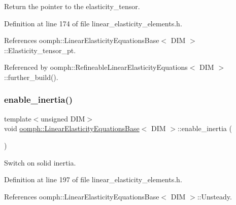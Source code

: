 Return the pointer to the elasticity\+\_\+tensor. 



Definition at line 174 of file linear\+\_\+elasticity\+\_\+elements.\+h.



References oomph\+::\+Linear\+Elasticity\+Equations\+Base$<$ D\+I\+M $>$\+::\+Elasticity\+\_\+tensor\+\_\+pt.



Referenced by oomph\+::\+Refineable\+Linear\+Elasticity\+Equations$<$ D\+I\+M $>$\+::further\+\_\+build().

\mbox{\label{classoomph_1_1LinearElasticityEquationsBase_ad69ad3d868ae9bbce38da212ca5ed4b7}} 
\subsubsection{\texorpdfstring{enable\+\_\+inertia()}{enable\_inertia()}}
{\footnotesize\ttfamily template$<$unsigned D\+IM$>$ \\
void \hyperlink{classoomph_1_1LinearElasticityEquationsBase}{oomph\+::\+Linear\+Elasticity\+Equations\+Base}$<$ D\+IM $>$\+::enable\+\_\+inertia (\begin{DoxyParamCaption}{ }\end{DoxyParamCaption})\hspace{0.3cm}{\ttfamily [inline]}}



Switch on solid inertia. 



Definition at line 197 of file linear\+\_\+elasticity\+\_\+elements.\+h.



References oomph\+::\+Linear\+Elasticity\+Equations\+Base$<$ D\+I\+M $>$\+::\+Unsteady.

\mbox{\label{classoomph_1_1LinearElasticityEquationsBase_add3ab9f1bbd914e5a460bfefb4eff5c9}} 
